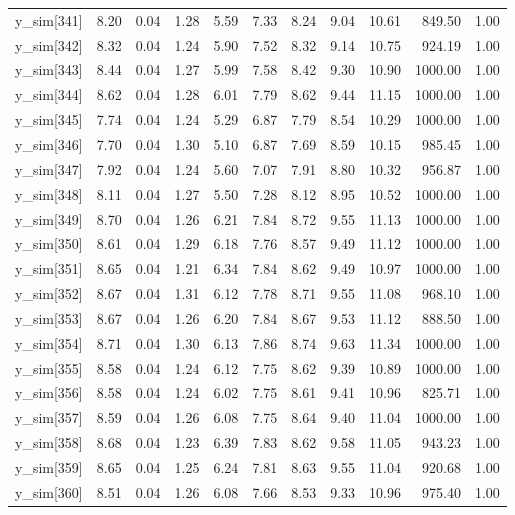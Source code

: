 \begin{table}[ht]
\begin{tabular}{rrrrrrrrrrr}
  y\_sim[341] & 8.20 & 0.04 & 1.28 & 5.59 & 7.33 & 8.24 & 9.04 & 10.61 & 849.50 & 1.00 \\ 
  y\_sim[342] & 8.32 & 0.04 & 1.24 & 5.90 & 7.52 & 8.32 & 9.14 & 10.75 & 924.19 & 1.00 \\ 
  y\_sim[343] & 8.44 & 0.04 & 1.27 & 5.99 & 7.58 & 8.42 & 9.30 & 10.90 & 1000.00 & 1.00 \\ 
  y\_sim[344] & 8.62 & 0.04 & 1.28 & 6.01 & 7.79 & 8.62 & 9.44 & 11.15 & 1000.00 & 1.00 \\ 
  y\_sim[345] & 7.74 & 0.04 & 1.24 & 5.29 & 6.87 & 7.79 & 8.54 & 10.29 & 1000.00 & 1.00 \\ 
  y\_sim[346] & 7.70 & 0.04 & 1.30 & 5.10 & 6.87 & 7.69 & 8.59 & 10.15 & 985.45 & 1.00 \\ 
  y\_sim[347] & 7.92 & 0.04 & 1.24 & 5.60 & 7.07 & 7.91 & 8.80 & 10.32 & 956.87 & 1.00 \\ 
  y\_sim[348] & 8.11 & 0.04 & 1.27 & 5.50 & 7.28 & 8.12 & 8.95 & 10.52 & 1000.00 & 1.00 \\ 
  y\_sim[349] & 8.70 & 0.04 & 1.26 & 6.21 & 7.84 & 8.72 & 9.55 & 11.13 & 1000.00 & 1.00 \\ 
  y\_sim[350] & 8.61 & 0.04 & 1.29 & 6.18 & 7.76 & 8.57 & 9.49 & 11.12 & 1000.00 & 1.00 \\ 
  y\_sim[351] & 8.65 & 0.04 & 1.21 & 6.34 & 7.84 & 8.62 & 9.49 & 10.97 & 1000.00 & 1.00 \\ 
  y\_sim[352] & 8.67 & 0.04 & 1.31 & 6.12 & 7.78 & 8.71 & 9.55 & 11.08 & 968.10 & 1.00 \\ 
  y\_sim[353] & 8.67 & 0.04 & 1.26 & 6.20 & 7.84 & 8.67 & 9.53 & 11.12 & 888.50 & 1.00 \\ 
  y\_sim[354] & 8.71 & 0.04 & 1.30 & 6.13 & 7.86 & 8.74 & 9.63 & 11.34 & 1000.00 & 1.00 \\ 
  y\_sim[355] & 8.58 & 0.04 & 1.24 & 6.12 & 7.75 & 8.62 & 9.39 & 10.89 & 1000.00 & 1.00 \\ 
  y\_sim[356] & 8.58 & 0.04 & 1.24 & 6.02 & 7.75 & 8.61 & 9.41 & 10.96 & 825.71 & 1.00 \\ 
  y\_sim[357] & 8.59 & 0.04 & 1.26 & 6.08 & 7.75 & 8.64 & 9.40 & 11.04 & 1000.00 & 1.00 \\ 
  y\_sim[358] & 8.68 & 0.04 & 1.23 & 6.39 & 7.83 & 8.62 & 9.58 & 11.05 & 943.23 & 1.00 \\ 
  y\_sim[359] & 8.65 & 0.04 & 1.25 & 6.24 & 7.81 & 8.63 & 9.55 & 11.04 & 920.68 & 1.00 \\ 
  y\_sim[360] & 8.51 & 0.04 & 1.26 & 6.08 & 7.66 & 8.53 & 9.33 & 10.96 & 975.40 & 1.00 \\ 

\end{tabular}
\end{table}

